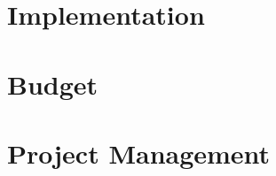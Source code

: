 \documentclass[english]{tauthesis}
\begin{document}
\chapter{Implementation}
\label{ch:implementation}


\chapter{Budget}
\label{ch:budget}


\chapter{Project Management}
\label{ch:project_management}





\printbibliography[heading=bibintoc]



\printbibliography[heading=bibintoc]
\end{document}
